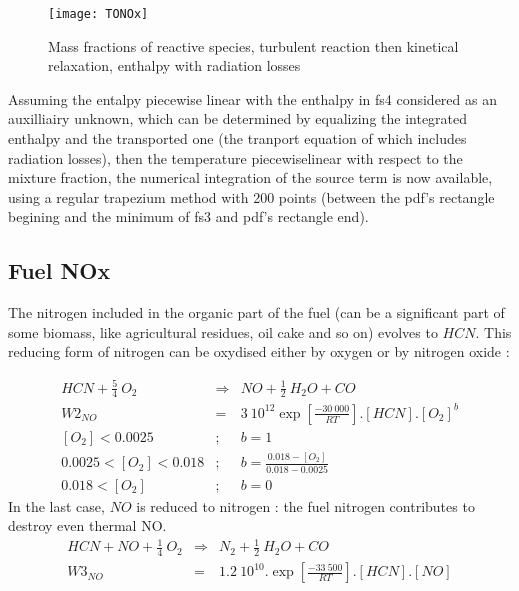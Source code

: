 \begin{figure}[h!]
\centerline{\texttt{[image: TONOx]}}
\caption{Mass fractions of reactive species, turbulent reaction then kinetical relaxation, enthalpy with radiation losses}
\end{figure}

Assuming the entalpy piecewise linear with the enthalpy in fs4 considered as an
auxilliairy unknown, which can be determined by equalizing the integrated
enthalpy and the transported one (the tranport equation of which includes
radiation losses), then the temperature piecewiselinear with respect to the
mixture fraction, the numerical integration of the source term is now available,
using a regular trapezium method with 200 points (between the pdf's rectangle
begining and the minimum of fs3 and pdf's rectangle end).

\subsection* {Fuel NOx}
The nitrogen included in the organic part of the fuel (can be a significant part
of some biomass, like agricultural residues, oil cake and so on) evolves to
$HCN$. This reducing form of nitrogen can be oxydised either by oxygen or by
nitrogen oxide :

\begin{eqnarray}
HCN + \frac{5}{4}~ O_{2} &\Rightarrow& NO + \frac{1}{2} ~H_{2}O + CO \nonumber \\
 W2_{NO} &=& 3 \medspace10^{12} \exp \left[\frac{- 30\medspace000}{RT}\right].\left[ HCN \right] . \left[O_{2}\right]^{\textstyle b}\\
\left[O_{2}\right] < 0.0025 &;& b = 1 \nonumber \\
0.0025 < \left[O_{2}\right] < 0.018 &;& b = \frac{0.018-\left[O_{2}\right]}{0.018-0.0025} \nonumber \\
0.018 < \left[O_{2}\right] &;& b = 0 \nonumber
\end{eqnarray}
In the last case, $NO$ is reduced to nitrogen : the fuel nitrogen contributes to destroy even thermal NO.
\begin{eqnarray}
 HCN + NO + \frac{1}{4}~ O_{2} &\Rightarrow& N_{2} + \frac{1}{2}~ H_{2}O + CO \nonumber \\
 W3_{NO} &=& 1.2 \medspace 10^{10}  .  \exp \left[\frac{-33\medspace500}{RT}\right].\left[ HCN \right] . \left[NO\right]
\end{eqnarray} 
\

